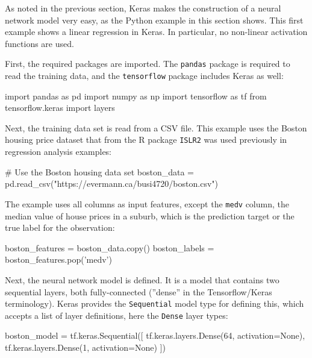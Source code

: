 As noted in the previous section, Keras makes the construction of a neural network model very easy, as the Python example in this section shows. This first example shows a linear regression in Keras. In particular, no non-linear activation functions are used. 

First, the required packages are imported. The \texttt{pandas} package is required to read the training data, and the \texttt{tensorflow} package includes Keras as well:

\begin{samepage}
\begin{pythoncode}
import pandas as pd
import numpy as np
import tensorflow as tf
from tensorflow.keras import layers
\end{pythoncode}
\end{samepage}

Next, the training data set is read from a CSV file. This example uses the Boston housing price dataset that from the R package \texttt{ISLR2} was used previously in regression analysis examples:

\begin{samepage}
\begin{pythoncode}
# Use the Boston housing data set
boston_data = pd.read_csv("https://evermann.ca/busi4720/boston.csv")
\end{pythoncode}
\end{samepage}

The example uses all columns as input features, except the \texttt{medv} column, the median value of house prices in a suburb, which is the prediction target or the true label for the observation:

\begin{samepage}
\begin{pythoncode}
boston_features = boston_data.copy()
boston_labels = boston_features.pop('medv')
\end{pythoncode}
\end{samepage}

Next, the neural network model is defined. It is a model that contains two sequential layers, both fully-connected (''dense'' in the Tensorflow/Keras terminology). Keras provides the \texttt{Sequential} model type for defining this, which accepts a list of layer definitions, here the \texttt{Dense} layer types:

\begin{samepage}
\begin{pythoncode}
boston_model = tf.keras.Sequential([
  tf.keras.layers.Dense(64, activation=None),
  tf.keras.layers.Dense(1, activation=None)
])
\end{pythoncode}
\end{samepage}

